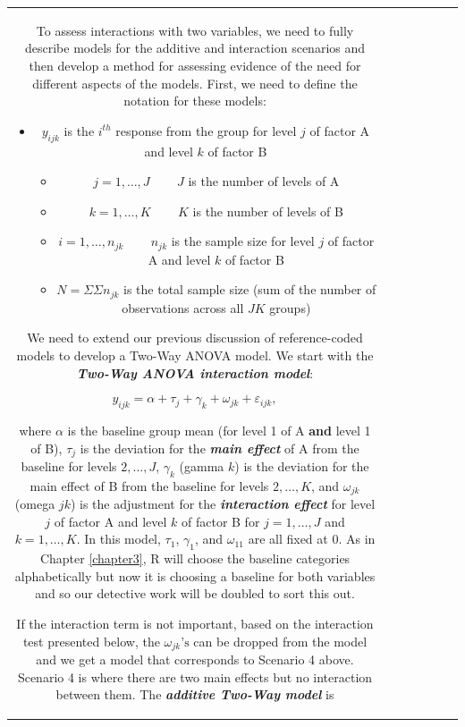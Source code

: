 \documentclass[]{book}
\theoremstyle{definition}
\theoremstyle{definition}
\theoremstyle{remark}
\begin{document}
\begin{longtable}[]{@{}ccccccc@{}}
\begin{minipage}[b]{0.10\columnwidth}
To assess interactions with two variables, we need to fully describe
models for the additive and interaction scenarios and then develop a
method for assessing evidence of the need for different aspects of the
models. First, we need to define the notation for these models:

\begin{itemize}
\item
  \(y_{ijk}\) is the \(i^{th}\) response from the group for level \(j\)
  of factor A and level \(k\) of factor B

  \begin{itemize}
  \item
    \(j=1,\ldots,J\) ~~~ \(J\) is the number of levels of A
  \item
    \(k=1,\ldots,K\) ~~~ \(K\) is the number of levels of B
  \item
    \(i=1,\ldots,n_{jk}\) ~~~ \(n_{jk}\) is the sample size for level
    \(j\) of factor A and level \(k\) of factor B
  \item
    \(N=\Sigma\Sigma n_{jk}\) is the total sample size (sum of the
    number of observations across all \(JK\) groups)
  \end{itemize}
\end{itemize}

We need to extend our previous discussion of reference-coded models to
develop a Two-Way ANOVA model. We start with the \textbf{\emph{Two-Way
ANOVA interaction model}}:

\[y_{ijk} = \alpha + \tau_j + \gamma_k + \omega_{jk} + \varepsilon_{ijk},\]

where \(\alpha\) is the baseline group mean (for level 1 of A
\textbf{and} level 1 of B), \(\tau_j\) is the deviation for the
\textbf{\emph{main effect}} of A from the baseline for levels
\(2,\ldots,J\), \(\gamma_k\) (gamma \(k\)) is the deviation for the main
effect of B from the baseline for levels \(2,\ldots,K\), and
\(\omega_{jk}\) (omega \(jk\)) is the adjustment for the
\textbf{\emph{interaction effect}} for level \(j\) of factor A and level
\(k\) of factor B for \(j=1,\ldots,J\) and \(k=1,\ldots,K\). In this
model, \(\tau_1\), \(\gamma_1\), and \(\omega_{11}\) are all fixed at 0.
As in Chapter \ref{chapter3}, R will choose the baseline categories
alphabetically but now it is choosing a baseline for both variables and
so our detective work will be doubled to sort this out.

If the interaction term is not important, based on the interaction test
presented below, the \(\omega_{jk}\text{'s}\) can be dropped from the
model and we get a model that corresponds to Scenario 4 above. Scenario
4 is where there are two main effects but no interaction between them.
The \textbf{\emph{additive Two-Way model}} is


\end{minipage}
\end{longtable}
\end{document}
